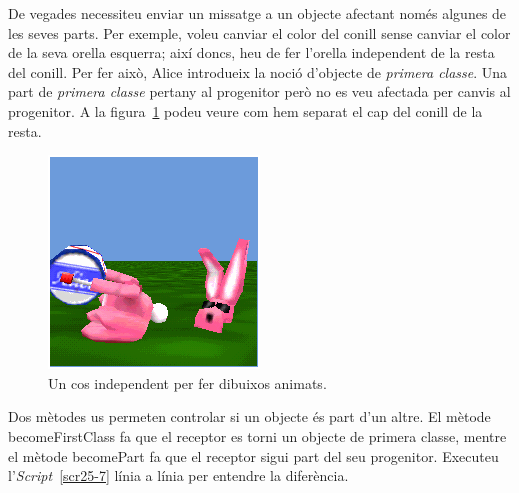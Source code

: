 De vegades necessiteu enviar un missatge a un objecte afectant només algunes de les seves parts. Per exemple, voleu canviar el color del conill sense canviar el color de la seva orella esquerra; així doncs, heu de fer l'orella independent de la resta del conill. Per fer això, Alice introdueix la noció d'objecte de \emph{primera classe}. Una part de \emph{primera classe} pertany al progenitor però no es veu afectada per canvis al progenitor. A la figura~\ref{fig2509} podeu veure com hem separat el cap del conill de la resta.  
\begin{figure}[h!]
\begin{center}
\includegraphics[scale=0.65]{Imatges/figura25-9}
\end{center}
\caption{Un cos independent per fer dibuixos animats.}
\label{fig2509}
\end{figure}

Dos mètodes us permeten controlar si un objecte és part d'un altre. El mètode \textsf{becomeFirstClass} fa que el receptor es torni un objecte de primera classe, mentre el mètode \textsf{becomePart} fa que el receptor sigui part del seu progenitor. Executeu l'\emph{Script}~\ref{scr25-7} línia a línia per entendre la diferència.

